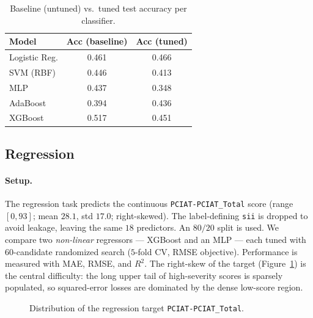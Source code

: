 \begin{table}[H]
\centering
\small
\caption{Baseline (untuned) vs.\ tuned test accuracy per classifier.}
\label{tab:cmi_baseline}
\begin{tabular}{l c c}
\hline
Model & Acc (baseline) & Acc (tuned) \\
\hline
Logistic Reg. & 0.461 & 0.466 \\
SVM (RBF)     & 0.446 & 0.413 \\
MLP           & 0.437 & 0.348 \\
AdaBoost      & 0.394 & 0.436 \\
XGBoost       & 0.517 & 0.451 \\
\hline
\end{tabular}
\end{table}

\subsection{Regression}
\label{sec:regression}
\paragraph{Setup.} The regression task predicts the continuous \texttt{PCIAT-PCIAT\_Total} score (range $[0,93]$; mean $28.1$, std $17.0$; right-skewed). The label-defining \texttt{sii} is dropped to avoid leakage, leaving the same $18$ predictors. An $80/20$ split is used. We compare two \emph{non-linear} regressors --- XGBoost and an MLP --- each tuned with $60$-candidate randomized search ($5$-fold CV, RMSE objective). Performance is measured with MAE, RMSE, and $R^2$. The right-skew of the target (Figure~\ref{fig:cmi_reg_target}) is the central difficulty: the long upper tail of high-severity scores is sparsely populated, so squared-error losses are dominated by the dense low-score region.

\begin{figure}[h]
    \centering
    \caption{Distribution of the regression target \texttt{PCIAT-PCIAT\_Total}.}
    \label{fig:cmi_reg_target}
\end{figure}

